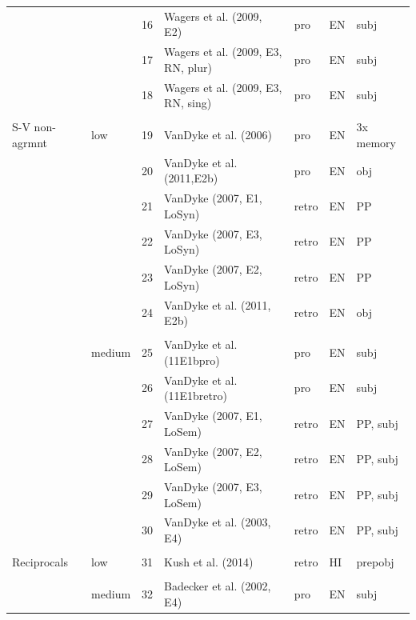 \documentclass{cambridge7A}\usepackage[]{graphicx}\usepackage[]{color}
\begin{document}
\begin{subappendices}
\begin{table}[ht]
{\begin{tabular}{llrllll}
               &            & 16    & Wagers et al. (2009, E2)            & pro     & EN   & subj \\
               &            & 17    & Wagers et al. (2009, E3, RN, plur)  & pro     & EN   & subj \\
               &            & 18    & Wagers et al. (2009, E3, RN, sing)  & pro     & EN   & subj \\
&&&&&& \\
S-V non-agrmnt & low      & 19    & VanDyke et al. (2006)               & pro     & EN   & 3x memory \\
               &            & 20    & VanDyke et al. (2011,E2b)           & pro     & EN   & obj \\
               &            & 21    & VanDyke (2007, E1, LoSyn)           & retro   & EN   & PP \\
               &            & 22    & VanDyke (2007, E3, LoSyn)           & retro   & EN   & PP \\
               &            & 23    & VanDyke (2007, E2, LoSyn)           & retro   & EN   & PP \\
               &            & 24    & VanDyke et al. (2011, E2b)          & retro   & EN   & obj \\
&&&&&& \\
               & medium         & 25    & VanDyke et al. (11E1bpro)           & pro     & EN   & subj \\
               &            & 26    & VanDyke et al. (11E1bretro)         & pro     & EN   & subj \\
               &            & 27    & VanDyke (2007, E1, LoSem)           & retro   & EN   & PP, subj \\
               &            & 28    & VanDyke (2007, E2, LoSem)           & retro   & EN   & PP, subj \\
               &            & 29    & VanDyke (2007, E3, LoSem)           & retro   & EN   & PP, subj \\
               &            & 30    & VanDyke et al. (2003, E4)           & retro   & EN   & PP, subj \\
&&&&&& \\
Reciprocals    & low      & 31    & Kush et al. (2014)                  & retro   & HI   & prepobj \\
&&&&&& \\
               & medium         & 32    & Badecker et al. (2002, E4)          & pro     & EN   & subj \\

\end{tabular}}
\end{table}
\end{subappendices}
\end{document}
